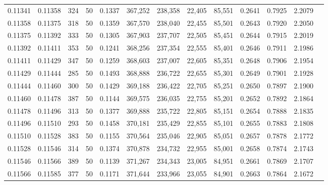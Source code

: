 \begin{tabular}{rrrrrrrrrrrrr}
0.11341 & 0.11358 &   324 &  50 &                                     0.1337 & 367,252 & 238,358 &  22,405 &  85,551 & 0.2641 & 0.7925 & 2.2079 \\
0.11358 & 0.11375 &   318 &  50 &                                     0.1359 & 367,570 & 238,040 &  22,455 &  85,501 & 0.2643 & 0.7920 & 2.2050 \\
0.11375 & 0.11392 &   333 &  50 &                                     0.1305 & 367,903 & 237,707 &  22,505 &  85,451 & 0.2644 & 0.7915 & 2.2019 \\
0.11392 & 0.11411 &   353 &  50 &                                     0.1241 & 368,256 & 237,354 &  22,555 &  85,401 & 0.2646 & 0.7911 & 2.1986 \\
0.11411 & 0.11429 &   347 &  50 &                                     0.1259 & 368,603 & 237,007 &  22,605 &  85,351 & 0.2648 & 0.7906 & 2.1954 \\
0.11429 & 0.11444 &   285 &  50 &                                     0.1493 & 368,888 & 236,722 &  22,655 &  85,301 & 0.2649 & 0.7901 & 2.1928 \\
0.11444 & 0.11460 &   300 &  50 &                                     0.1429 & 369,188 & 236,422 &  22,705 &  85,251 & 0.2650 & 0.7897 & 2.1900 \\
0.11460 & 0.11478 &   387 &  50 &                                     0.1144 & 369,575 & 236,035 &  22,755 &  85,201 & 0.2652 & 0.7892 & 2.1864 \\
0.11478 & 0.11496 &   313 &  50 &                                     0.1377 & 369,888 & 235,722 &  22,805 &  85,151 & 0.2654 & 0.7888 & 2.1835 \\
0.11496 & 0.11510 &   293 &  50 &                                     0.1458 & 370,181 & 235,429 &  22,855 &  85,101 & 0.2655 & 0.7883 & 2.1808 \\
0.11510 & 0.11528 &   383 &  50 &                                     0.1155 & 370,564 & 235,046 &  22,905 &  85,051 & 0.2657 & 0.7878 & 2.1772 \\
0.11528 & 0.11546 &   314 &  50 &                                     0.1374 & 370,878 & 234,732 &  22,955 &  85,001 & 0.2658 & 0.7874 & 2.1743 \\
0.11546 & 0.11566 &   389 &  50 &                                     0.1139 & 371,267 & 234,343 &  23,005 &  84,951 & 0.2661 & 0.7869 & 2.1707 \\
0.11566 & 0.11585 &   377 &  50 &                                     0.1171 & 371,644 & 233,966 &  23,055 &  84,901 & 0.2663 & 0.7864 & 2.1672 \\

\end{tabular}
